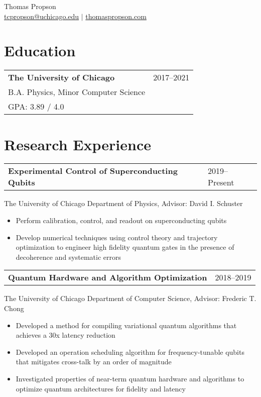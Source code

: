 \documentclass[letterpaper, 11pt]{article}
\begin{document}
\begin{center}
{\large Thomas Propson} \\[5pt]
\href{mailto:tcpropson@uchicago.edu}{tcpropson@uchicago.edu} $\vert$
\href{https://thomaspropson.com}{thomaspropson.com}
\end{center}


\flushleft

\section{Education}
\begin{tabular}{@{} L{12cm} @{} R{4.51cm} @{}}
  \textbf{The University of Chicago} & 2017--2021\\
  B.A. Physics, Minor Computer Science &\\
  GPA: 3.89 / 4.0 &\\
\end{tabular}

\section{Research Experience}
\begin{tabular}{@{} L{12cm} @{} R{4.51cm} @{}}
  \textbf{Experimental Control of Superconducting Qubits} & 2019--Present\\
\end{tabular}
The University of Chicago Department of Physics, Advisor: David I. Schuster\\
\begin{itemize}
  \item Perform calibration, control, and readout on superconducting qubits
  \item Develop numerical techniques using control theory and trajectory optimization
    to engineer high fidelity quantum gates in the presence of decoherence and systematic errors
\end{itemize}

\begin{tabular}{@{} L{12cm} @{} R{4.51cm} @{}}
  \textbf{Quantum Hardware and Algorithm Optimization} & 2018--2019\\
\end{tabular}
The University of Chicago Department of Computer Science, Advisor: Frederic T. Chong
\begin{itemize}
\item Developed a method for compiling variational quantum algorithms
  that achieves a 30x latency reduction
\item Developed an operation scheduling algorithm for
  frequency-tunable qubits that mitigates cross-talk by an order of magnitude
\item Investigated properties of near-term quantum hardware and algorithms
  to optimize quantum architectures for fidelity and latency
\end{itemize}
\end{document}

